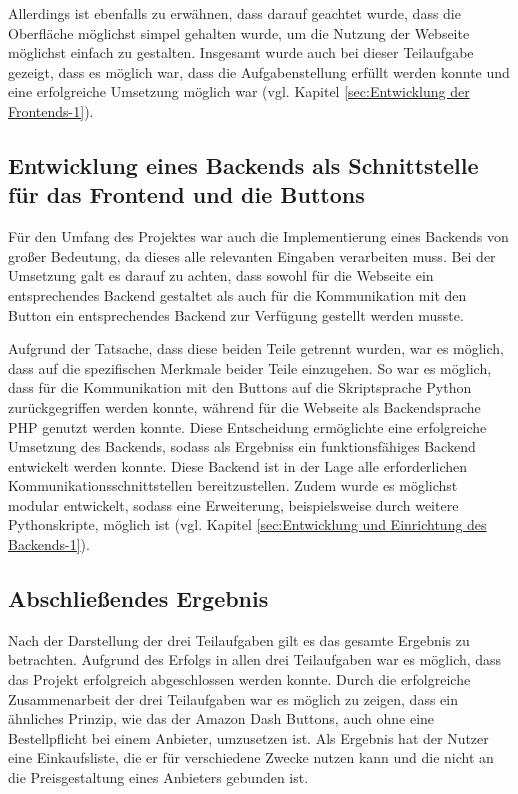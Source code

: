 Allerdings ist ebenfalls zu erwähnen, dass darauf geachtet wurde, dass die Oberfläche möglichst simpel gehalten wurde, um die Nutzung der Webseite möglichst einfach zu gestalten. 
Insgesamt wurde auch bei dieser Teilaufgabe gezeigt, dass es möglich war, dass die Aufgabenstellung erfüllt werden konnte und eine erfolgreiche Umsetzung möglich war (vgl. Kapitel \ref{sec:Entwicklung der Frontends-1}).

\newpage

\subsection{Entwicklung eines Backends als Schnittstelle für das Frontend und die Buttons}
\label{sec:ErgebnisBackend}
Für den Umfang des Projektes war auch die Implementierung eines Backends von großer Bedeutung, da dieses alle relevanten Eingaben verarbeiten muss. Bei der Umsetzung galt es darauf zu achten, dass sowohl für die Webseite ein entsprechendes Backend gestaltet als auch für die Kommunikation mit den Button ein entsprechendes Backend zur Verfügung gestellt werden musste. 

Aufgrund der Tatsache, dass diese beiden Teile getrennt wurden, war es möglich, dass auf die spezifischen Merkmale beider Teile einzugehen. So war es möglich, dass für die Kommunikation mit den Buttons auf die Skriptsprache Python zurückgegriffen werden konnte, während für die Webseite als Backendsprache \ac{PHP} genutzt werden konnte. Diese Entscheidung ermöglichte eine erfolgreiche Umsetzung des Backends, sodass als Ergebniss ein funktionsfähiges Backend entwickelt werden konnte. Diese Backend ist in der Lage alle erforderlichen Kommunikationsschnittstellen bereitzustellen. Zudem wurde es möglichst modular entwickelt, sodass eine Erweiterung, beispielsweise durch weitere Pythonskripte, möglich ist (vgl. Kapitel \ref{sec:Entwicklung und Einrichtung des Backends-1}). 

\subsection{Abschließendes Ergebnis}
\label{sec:ErgebnisAbschluss}
Nach der Darstellung der drei Teilaufgaben gilt es das gesamte Ergebnis zu betrachten. Aufgrund des Erfolgs in allen drei Teilaufgaben war es möglich, dass das Projekt erfolgreich abgeschlossen werden konnte. Durch die erfolgreiche Zusammenarbeit der drei Teilaufgaben war es möglich zu zeigen, dass ein ähnliches Prinzip, wie das der Amazon Dash Buttons, auch ohne eine Bestellpflicht bei einem Anbieter, umzusetzen ist. Als Ergebnis hat der Nutzer eine Einkaufsliste, die er für verschiedene Zwecke nutzen kann und die nicht an die Preisgestaltung eines Anbieters gebunden ist. 

